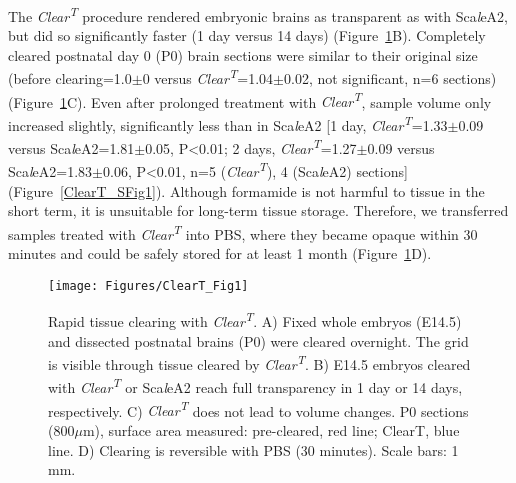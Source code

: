 The \emph{Clear\textsuperscript{T}} procedure rendered embryonic brains as transparent as with Sca\emph{l}eA2, but did so significantly faster (1 day versus 14 days) (Figure~\ref{ClearT_Fig1}B).
Completely cleared postnatal day 0 (P0) brain sections were similar to their original size (before clearing=1.0$\pm$0 versus \emph{Clear\textsuperscript{T}}=1.04$\pm$0.02, not significant, n=6 sections) (Figure~\ref{ClearT_Fig1}C).
Even after prolonged treatment with \emph{Clear\textsuperscript{T}}, sample volume only increased slightly, significantly less than in Sca\emph{l}eA2 [1 day, \emph{Clear\textsuperscript{T}}=1.33$\pm$0.09 versus Sca\emph{l}eA2=1.81$\pm$0.05, P<0.01; 2 days, \emph{Clear\textsuperscript{T}}=1.27$\pm$0.09 versus Sca\emph{l}eA2=1.83$\pm$0.06, P<0.01, n=5 (\emph{Clear\textsuperscript{T}}), 4 (Sca\emph{l}eA2) sections] (Figure~\ref{ClearT_SFig1}).
Although formamide is not harmful to tissue in the short term, it is unsuitable for long-term tissue storage.
Therefore, we transferred samples treated with \emph{Clear\textsuperscript{T}} into PBS, where they became opaque within 30 minutes and could be safely stored for at least 1 month (Figure~\ref{ClearT_Fig1}D).
\begin{figure}[hbtp]
    \begin{center}
        \texttt{[image: Figures/ClearT\_Fig1]}
        \caption[Rapid tissue clearing with \emph{Clear\textsuperscript{T}}.]
        {Rapid tissue clearing with \emph{Clear\textsuperscript{T}}.
        A) Fixed whole embryos (E14.5) and dissected postnatal brains (P0) were cleared overnight.
        The grid is visible through tissue cleared by \emph{Clear\textsuperscript{T}}.
        B) E14.5 embryos cleared with \emph{Clear\textsuperscript{T}} or Sca\emph{l}eA2 reach full transparency in 1 day or 14 days,
        respectively.
        C) \emph{Clear\textsuperscript{T}} does not lead to volume changes.
        P0 sections (800$\mu$m), surface area measured: pre-cleared, red line; ClearT, blue line.
        D) Clearing is reversible with PBS (30 minutes).
        Scale bars: 1 mm.
        }
        \label{ClearT_Fig1}
    \end{center}
\end{figure}
